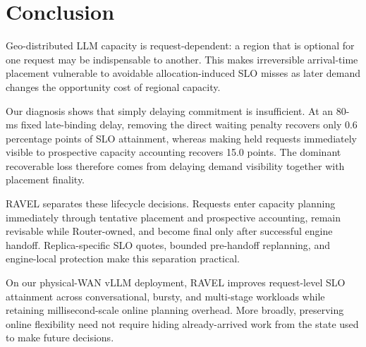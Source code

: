 \section{Conclusion}

Geo-distributed LLM capacity is request-dependent: a region that is optional
for one request may be indispensable to another.
This makes irreversible arrival-time placement vulnerable to avoidable
allocation-induced SLO misses as later demand changes the opportunity cost of
regional capacity.

Our diagnosis shows that simply delaying commitment is insufficient.
At an 80-ms fixed late-binding delay, removing the direct waiting penalty
recovers only 0.6 percentage points of SLO attainment, whereas making held
requests immediately visible to prospective capacity accounting recovers
15.0 points.
The dominant recoverable loss therefore comes from delaying demand visibility
together with placement finality.

RAVEL separates these lifecycle decisions.
Requests enter capacity planning immediately through tentative placement and
prospective accounting, remain revisable while Router-owned, and become final
only after successful engine handoff.
Replica-specific SLO quotes, bounded pre-handoff replanning, and engine-local
protection make this separation practical.

On our physical-WAN vLLM deployment, RAVEL improves request-level SLO attainment
across conversational, bursty, and multi-stage workloads while retaining
millisecond-scale online planning overhead.
More broadly, preserving online flexibility need not require hiding
already-arrived work from the state used to make future decisions.
